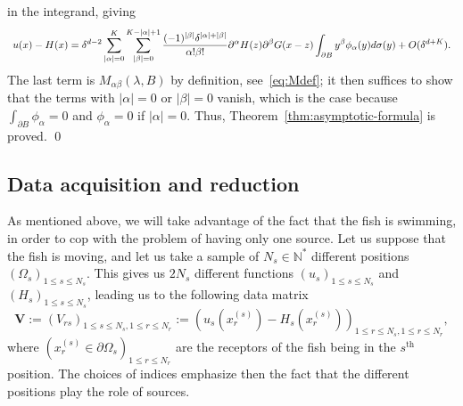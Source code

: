 in the integrand, giving
\[\begin{array}{l}
\displaystyle
u(x)-H(x)=\delta^{d-2}\sum_{\left|\alpha\right|=0}^{K}\sum_{\left|\beta\right|=0}^{K-\left|
\alpha\right|+1}\frac{(-1)^{\vert\beta\vert}\delta^{\left|\alpha\right|+\left|\beta\right|}}{\alpha!\beta!}
\partial^{\alpha}H(z)
\partial^{\beta}G(x-z)\int_{\partial
B}y^{\beta}\phi_{\alpha}(y)d\sigma(y)+O(\delta^{d+K}).
\end{array} \] The last term is $M_{\alpha\beta}(\lambda,B)$ by
definition, see~\eqref{eq:Mdef}; it then suffices to show that
the terms with $\left|\alpha\right|=0$ or $\left|\beta\right|=0$
vanish, which is the case because $\int_{\partial
B}\phi_{\alpha}=0$ and $\phi_{\alpha}=0$ if
$\left|\alpha\right|=0$. Thus,
Theorem~\ref{thm:asymptotic-formula} is proved. \qed


\subsection{Data acquisition and reduction}

\label{sub:data-acq-move}

As mentioned above, we will take advantage of the fact that the
fish is swimming, in order to cop with the problem of having only
one source.
Let us suppose that the fish is moving, and let us take a sample
of $N_s\in\mathbb{N}^{*}$ different positions
$\left(\Omega_{s}\right)_{1\leq s\leq N_s}$. This gives us $2 N_s$
different functions $\left(u_{s}\right)_{1\leq s\leq N_s}$ and
$\left(H_{s}\right)_{1\leq s\leq N_s}$, leading us to the following
data matrix
\begin{equation}
\mathbf{V}:=\left(V_{rs}\right)_{1\leq s\leq N_s,1\leq r\leq N_r}:=
\left(u_{s}(x_{r}^{(s)})-H_{s}(x_{r}^{(s)})\right)_{1\leq r\leq N_s,1\leq r\leq N_r},\label{eq:def-Q}
\end{equation}
where $(x_{r}^{(s)}\in\partial\Omega_{s})_{1\leq r\leq N_r}$ are the
receptors of the fish being in the $s^{\mbox{th}}$ position. The
choices of indices emphasize then the fact that the different
positions play the role of sources.

